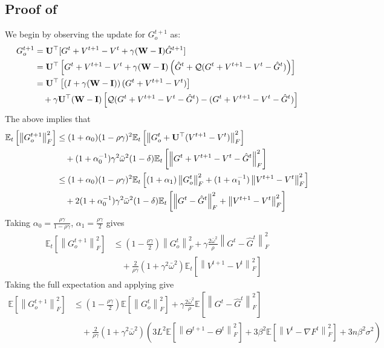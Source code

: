 \documentclass[10pt]{article} %
\theoremstyle{plain}
\theoremstyle{definition}
\theoremstyle{remark}
\newcommand{\grdF}{\nabla F}
\newcommand{\bw}{\bar{\omega}}
\newcommand{\norm}[1]{\left\| #1 \right\|}
\newcommand{\nl}{\nonumber\\}
\newcommand{\W}{{\bf W}}
\newcommand{\U}{{\bf U}}
\newcommand{\I}{{\bf I}}
\begin{document}
\subsection{Proof of } \label{app:gt_new}
We begin by observing the update for $G_o^{t+1}$ as:
\begin{align*}
G^{t+1}_o &= \U^\top[G^t + V^{t+1} - V^t +\gamma(\W-\I)\hat{G}^{t+1}] \\
& = \U^\top \left[ G^t + V^{t+1} - V^t +\gamma(\W-\I) \left( \hat{G}^t + {\cal Q}( G^t + V^{t+1} - V^t - \hat{G}^t ) \right) \right] \\
& = \U^\top \left[ \left( I + \gamma(\W-\I) \right) ( G^t + V^{t+1} - V^t ) \right] \\
& \quad + \gamma \U^\top (\W-\I) \left[ {\cal Q}( G^t + V^{t+1} - V^t - \hat{G}^t ) - (G^t + V^{t+1} - V^t - \hat{G}^t) \right]
\end{align*}
The above implies that 
\begin{align*}
\mathbb{E}_t \left[ \norm{G_o^{t+1}}_F^2 \right] & \leq (1 + \alpha_0) ( 1 - \rho \gamma )^2 \mathbb{E}_t \left[ \norm{ G_o^t + \U^\top ( V^{t+1} - V^t ) }_F^2 \right] \\ 
& \quad + (1 + \alpha_0^{-1}) \gamma^2 \bw^2 (1 - \delta) \mathbb{E}_t \left[ \norm{ G^t + V^{t+1} - V^t - \hat{G}^t }_F^2 \right] \\
& \leq (1 + \alpha_0) ( 1 - \rho \gamma )^2 \mathbb{E}_t \left[ (1 + \alpha_1) \norm{ G_o^t }_F^2 + (1 + \alpha_1^{-1}) \norm{ V^{t+1} - V^t }_F^2 \right] \nl 
& \quad + 2 (1 + \alpha_0^{-1}) \gamma^2 \bw^2 (1 - \delta) \mathbb{E}_t \left[ \norm{ G^t - \hat{G}^t }_F^2 + \norm{ V^{t+1} - V^t }_F^2 \right]
\end{align*}
Taking $\alpha_0 = \frac{ \rho \gamma }{ 1 - \rho \gamma }$, $\alpha_1 = \frac{\rho \gamma}{2}$ gives
\begin{align*}
\mathbb{E}_t \left[ \norm{G_o^{t+1}}_F^2 \right] & \leq \left( 1 - \frac{ \rho \gamma }{2} \right) \norm{ G_o^t }_F^2 + \gamma \frac{ 2 \bw^2}{ \rho } \norm{ G^t - \hat{G}^t }_F^2 \nl 
& \quad + \frac{2}{\rho \gamma} \left( 1 + \gamma^2 \bw^2 \right) \mathbb{E}_t \left[ \norm{ V^{t+1} - V^t }_F^2 \right]
\end{align*}
Taking the full expectation and applying  give
\begin{align*}
\mathbb{E} \left[ \norm{G_o^{t+1}}_F^2 \right] & \leq \left( 1 - \frac{ \rho \gamma }{2} \right) \mathbb{E} \left[ \norm{ G_o^t }_F^2 \right] + \gamma \frac{ 2 \bw^2}{ \rho } \mathbb{E} \left[ \norm{ G^t - \hat{G}^t }_F^2 \right] \nl 
& \quad + \frac{2}{\rho \gamma} \left( 1 + \gamma^2 \bw^2 \right) \left( 3 L^2 \mathbb{E} \left[ \norm{ \Theta^{t+1} - \Theta^t }_F^2 \right] + 3 \beta^2 \mathbb{E} \left[ \norm{V^t - \grdF^t}_F^2 \right] + 3 n \beta^2 \sigma^2 \right)
\end{align*}
\end{document}
